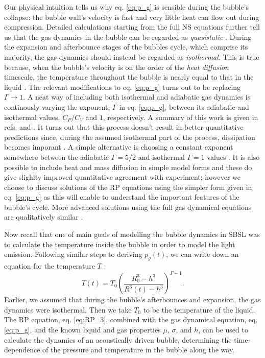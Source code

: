 \documentclass[rmp,aps,nofootinbib,superscriptaddress,floatfix]{revtex4-2}
\begin{document}
Our physical intuition tells us why eq. \ref{eq:p_g} is sensible during the bubble's collapse: the bubble wall's velocity is fast and very little heat can flow out during compression. Detailed calculations starting from the full NS equations further tell us that the gas dynamics in the bubble can be regarded as \emph{quasistatic} \cite{}. During the expansion and afterbounce stages of the bubbles cycle, which comprise its majority, the gas dynamics should instead be regarded as \emph{isothermal}. This is true because, when the bubble's velocity is on the order of the \emph{heat diffusion} timescale, the temperature throughout the bubble is nearly equal to that in the liquid \cite{prosperetti1999old,brenner2002single,yasui2018acoustic}. The relevant modifications to eq. \ref{eq:p_g} turns out to be replacing $\Gamma\rightarrow 1$. A neat way of including both isothermal and adiabatic gas dynamics is continously varying the exponent, $\Gamma$ in eq. \ref{eq:p_g}, between its adiabatic and isothermal values, $C_P/C_V$ and $1$, respectively. A summary of this work is given in refs. \cite{brenner2002single} and \cite{prosperetti1999old}. It turns out that this process doesn't result in better quantitative predictions since, during the assumed isothermal part of the process, dissipation becomes imporant \cite{brenner2002single}. A simple alternative is choosing a constant exponent somewhere between the adiabatic $\Gamma=5/2$ and isothermal $\Gamma=1$ values \cite{hilgenfeldt1999simple}. It is also possible to include heat and mass diffusion in simple model forms and these do give slighlty improved quantitative agreement with experiment; however we choose to discuss solutions of the RP equations using the simpler form given in eq. \ref{eq:p_g} as this will enable to understand the important features of the bubble's cycle. More advanced solutions using the full gas dynamical equations are qualitatively similar \cite{brenner2002single,yasui2018acoustic}.

Now recall that one of main goals of modelling the bubble dynamics in SBSL was to calculate the temperature inside the bubble in order to model the light emission. Following similar steps to deriving $p_g(t)$, we can write down an equation for the temperature $T$ \cite{barber1997defining,brenner2002single}:
\begin{equation}
    T(t) = T_0 \left( \frac{R_0^3-h^3}{R^3(t)-h^3} \right)^ {\Gamma-1}.
    \label{eq:T(t)}
\end{equation}
Earlier, we assumed that during the bubble's afterbounces and expansion, the gas dynamics were isothermal. Then we take $T_0$ to be the temperature of the liquid. The RP equation, eq. \ref{eq:RP_3}, combined with the gas dynamical equation, eq. \ref{eq:p_g}, and the known liquid and gas properties $\mu$, $\sigma$, and $h$, can be used to calculate the dynamics of an acoustically driven bubble, determining the time-dependence of the pressure and temperature in the bubble along the way. 
\end{document}
